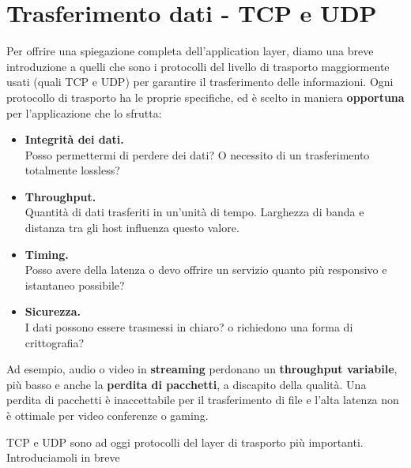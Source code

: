 \section{Trasferimento dati - TCP e UDP}
Per offrire una spiegazione completa dell'application layer, diamo una breve introduzione a quelli che sono i protocolli del livello di trasporto maggiormente usati (quali TCP e UDP) per garantire il trasferimento delle informazioni. Ogni protocollo di trasporto ha le proprie specifiche, ed è scelto in maniera \textbf{opportuna} per l'applicazione che lo sfrutta:
\begin{itemize}
    \item \textbf{Integrità dei dati.}\\
    Posso permettermi di perdere dei dati? O necessito di un trasferimento totalmente lossless?
    \item \textbf{Throughput.}\\
    Quantità di dati trasferiti in un'unità di tempo. Larghezza di banda e distanza tra gli host influenza questo valore.
    \item \textbf{Timing.}\\
    Posso avere della latenza o devo offrire un servizio quanto più responsivo e istantaneo possibile?
    \item \textbf{Sicurezza.}\\
    I dati possono essere trasmessi in chiaro? o richiedono una forma di crittografia?
\end{itemize}
Ad esempio, audio o video in \textbf{streaming} perdonano un \textbf{throughput variabile}, più basso e anche la \textbf{perdita di pacchetti}, a discapito della qualità. Una perdita di pacchetti è inaccettabile per il trasferimento di file e l'alta latenza non è ottimale per video conferenze o gaming.

TCP e UDP sono ad oggi protocolli del layer di trasporto più importanti. Introduciamoli in breve 

